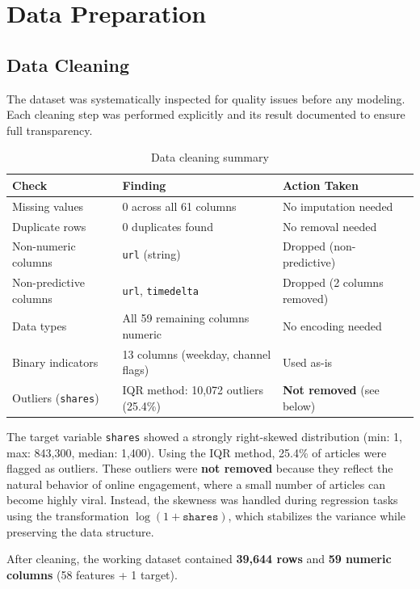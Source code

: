 
\section{Data Preparation}

\subsection{Data Cleaning}

The dataset was systematically inspected for quality issues before any modeling. Each cleaning step was performed explicitly and its result documented to ensure full transparency.

\begin{table}[H]
\centering
\caption{Data cleaning summary}
\begin{tabular}{lll}
\toprule
\textbf{Check} & \textbf{Finding} & \textbf{Action Taken} \\
\midrule
Missing values & 0 across all 61 columns & No imputation needed \\
Duplicate rows & 0 duplicates found & No removal needed \\
Non-numeric columns & \texttt{url} (string) & Dropped (non-predictive) \\
Non-predictive columns & \texttt{url}, \texttt{timedelta} & Dropped (2 columns removed) \\
Data types & All 59 remaining columns numeric & No encoding needed \\
Binary indicators & 13 columns (weekday, channel flags) & Used as-is \\
Outliers (\texttt{shares}) & IQR method: 10,072 outliers (25.4\%) & \textbf{Not removed} (see below) \\
\bottomrule
\end{tabular}
\end{table}

\noindent The target variable \texttt{shares} showed a strongly right-skewed distribution (min: 1, max: 843,300, median: 1,400). Using the IQR method, 25.4\% of articles were flagged as outliers. These outliers were \textbf{not removed} because they reflect the natural behavior of online engagement, where a small number of articles can become highly viral. Instead, the skewness was handled during regression tasks using the transformation $\log(1 + \texttt{shares})$, which stabilizes the variance while preserving the data structure.

After cleaning, the working dataset contained \textbf{39,644 rows} and \textbf{59 numeric columns} (58 features + 1 target).

